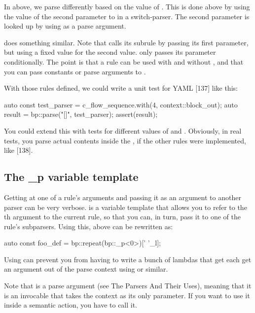 \documentclass{MyBook}
\begin{document}
In  above, we parse differently based on the value of . This is done above by using the value of the second parameter to  in a switch-parser. The second parameter is looked up by using  as a parse argument.

 does something similar. Note that  calls its subrule by passing its first parameter, but using a fixed value for the second value.  only passes its  parameter conditionally. The point is that a rule can be used with and without , and that you can pass constants or parse arguments to .

With those rules defined, we could write a unit test for YAML {[}137{]} like this:

\begin{code}
auto const test_parser = c_flow_sequence.with(4, context::block_out);
auto result = bp::parse("[]", test_parser);
assert(result);
\end{code}

You could extend this with tests for different values of  and . Obviously, in real tests, you parse actual contents inside the , if the other rules were implemented, like {[}138{]}.

\subsection{The \_p variable template}

Getting at one of a rule's arguments and passing it as an argument to another parser can be very verbose.  is a variable template that allows you to refer to the th argument to the current rule, so that you can, in turn, pass it to one of the rule's subparsers. Using this,  above can be rewritten as:

\begin{code}
auto const foo_def = bp::repeat(bp::_p<0>)[' '_l];
\end{code}

Using  can prevent you from having to write a bunch of lambdas that get each get an argument out of the parse context using  or similar.

Note that  is a parse argument (see The Parsers And Their Uses), meaning that it is an invocable that takes the context as its only parameter. If you want to use it inside a semantic action, you have to call it.
\end{document}
